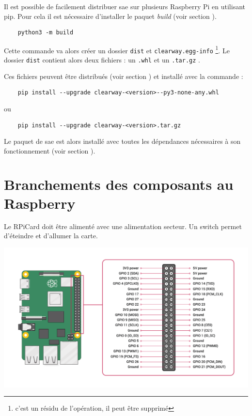 Il est possible de facilement distribuer \gls{sae} sur plusieurs Raspberry Pi en utilisant \gls{pip}. Pour
cela il est nécessaire d'installer le \gls{paquet} \textit{build} (voir section ).

\begin{verbatim}
    python3 -m build
\end{verbatim}

Cette commande va alors créer un dossier \texttt{dist} et \texttt{clearway.egg-info}
\footnote{c'est un résidu de l'opération, il  peut être supprimé}. Le dossier \texttt{dist} contient
alors deux fichiers : un \texttt{.whl} et un \texttt{.tar.gz} \nocite{wheel}\nocite{setuptools}.\newline

Ces fichiers peuvent être distribués (voir section ) et installé avec la commande :

\begin{verbatim}
    pip install --upgrade clearway-<version>--py3-none-any.whl
\end{verbatim}

ou

\begin{verbatim}
    pip install --upgrade clearway-<version>.tar.gz
\end{verbatim}

Le \gls{paquet} de \gls{sae} est alors installé avec toutes les dépendances nécessaires à son fonctionnement (voir
section ).

\newpage
\section{Branchements des composants au Raspberry}
Le \gls{RPiCard} doit être alimenté avec une alimentation secteur. Un switch permet d'éteindre et d'allumer la carte.

\includegraphics[width=\textwidth]{img/Rpi4_pin.png}

